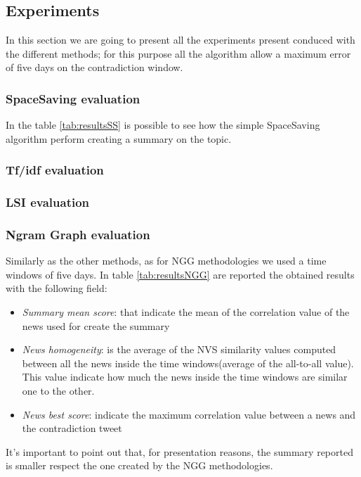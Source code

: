 \subsection*{Experiments}
In this section we are going to present all the experiments present conduced with the different methods; for this purpose all the algorithm allow a maximum error of five days on the contradiction window.

\subsubsection*{SpaceSaving evaluation}
In the table \ref{tab:resultsSS} is possible to see how the simple SpaceSaving algorithm perform creating a summary on the topic.

\subsubsection*{Tf/idf evaluation}


\subsubsection*{LSI evaluation}




\subsubsection*{Ngram Graph evaluation}
Similarly as the other methods, as for NGG methodologies we used a time windows of five days. In table \ref{tab:resultsNGG} are reported the obtained results with the following field:
\begin{itemize}
	\item \emph{Summary mean score}: that indicate the mean of the correlation value of the news used for create the summary
	\item \emph{News homogeneity}: is the average of the NVS similarity values computed between all the news inside the time windows(average of the all-to-all value). This value indicate how much the news inside the time windows are similar one to the other.
	\item \emph{News best score}: indicate the maximum correlation value between a news and the contradiction tweet
\end{itemize}
It's important to point out that, for presentation reasons, the summary reported is smaller respect the one created by the NGG methodologies.


